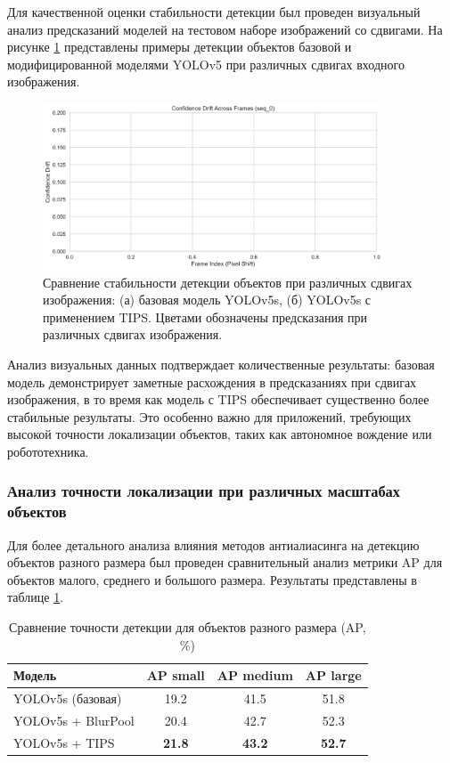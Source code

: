 Для качественной оценки стабильности детекции был проведен визуальный анализ предсказаний моделей на тестовом наборе изображений со сдвигами. На рисунке \ref{fig:detection_stability} представлены примеры детекции объектов базовой и модифицированной моделями YOLOv5 при различных сдвигах входного изображения.

\begin{figure}[h]
\centering
\includegraphics[width=0.9\textwidth]{figures/detection/yolo_stability_comparison.png}
\caption{Сравнение стабильности детекции объектов при различных сдвигах изображения: (а) базовая модель YOLOv5s, (б) YOLOv5s с применением TIPS. Цветами обозначены предсказания при различных сдвигах изображения.}
\label{fig:detection_stability}
\end{figure}

Анализ визуальных данных подтверждает количественные результаты: базовая модель демонстрирует заметные расхождения в предсказаниях при сдвигах изображения, в то время как модель с TIPS обеспечивает существенно более стабильные результаты. Это особенно важно для приложений, требующих высокой точности локализации объектов, таких как автономное вождение или робототехника.

\subsubsection{Анализ точности локализации при различных масштабах объектов}

Для более детального анализа влияния методов антиалиасинга на детекцию объектов разного размера был проведен сравнительный анализ метрики AP для объектов малого, среднего и большого размера. Результаты представлены в таблице \ref{tab:detection_size_results}.

\begin{table}[h]
\centering
\caption{Сравнение точности детекции для объектов разного размера (AP, \%)}
\label{tab:detection_size_results}
\begin{tabular}{lccc}
\toprule
\textbf{Модель} & \textbf{AP small} & \textbf{AP medium} & \textbf{AP large} \\
\midrule
YOLOv5s (базовая) & 19.2 & 41.5 & 51.8 \\
YOLOv5s + BlurPool & 20.4 & 42.7 & 52.3 \\
YOLOv5s + TIPS & \textbf{21.8} & \textbf{43.2} & \textbf{52.7} \\
\bottomrule
\end{tabular}
\end{table}


